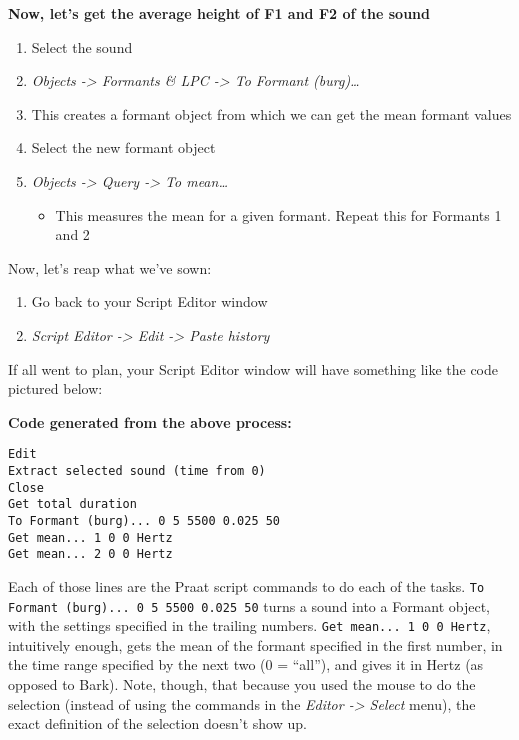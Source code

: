 \textbf{Now, let's get the average height of F1 and F2 of the sound}

\begin{enumerate}
\def\labelenumi{\arabic{enumi}.}
\setcounter{enumi}{5}
\tightlist
\item
  Select the sound
\item
  \emph{Objects -\textgreater{} Formants \& LPC -\textgreater{} To
  Formant (burg)\ldots{}}
\item
  This creates a formant object from which we can get the mean formant
  values
\item
  Select the new formant object
\item
  \emph{Objects -\textgreater{} Query -\textgreater{} To mean\ldots{}}

  \begin{itemize}
  \tightlist
  \item
    This measures the mean for a given formant. Repeat this for Formants
    1 and 2
  \end{itemize}
\end{enumerate}

Now, let's reap what we've sown:

\begin{enumerate}
\def\labelenumi{\arabic{enumi}.}
\setcounter{enumi}{10}
\tightlist
\item
  Go back to your Script Editor window
\item
  \emph{Script Editor -\textgreater{} Edit -\textgreater{} Paste
  history}
\end{enumerate}

If all went to plan, your Script Editor window will have something like
the code pictured below:

\textbf{Code generated from the above process:}

\begin{verbatim} 
Edit
Extract selected sound (time from 0)
Close
Get total duration
To Formant (burg)... 0 5 5500 0.025 50
Get mean... 1 0 0 Hertz
Get mean... 2 0 0 Hertz
\end{verbatim}

Each of those lines are the Praat script commands to do each of the
tasks. \texttt{To Formant (burg)... 0 5 5500 0.025 50} turns a sound
into a Formant object, with the settings specified in the trailing
numbers. \texttt{Get mean... 1 0 0 Hertz}, intuitively enough, gets the
mean of the formant specified in the first number, in the time range
specified by the next two (0 = ``all''), and gives it in Hertz (as
opposed to Bark). Note, though, that because you used the mouse to do
the selection (instead of using the commands in the \emph{Editor
-\textgreater{} Select} menu), the exact definition of the selection
doesn't show up.

